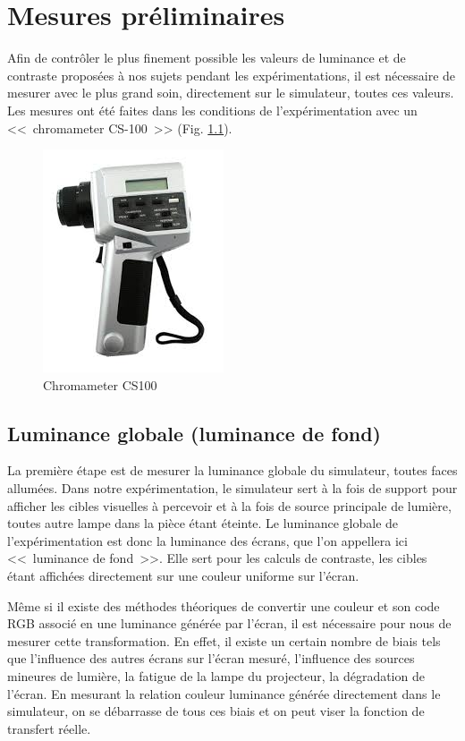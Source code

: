 \chapter{Mesures préliminaires}
\par Afin de contrôler le plus finement possible les valeurs de luminance et de contraste proposées à nos sujets pendant les expérimentations, il est nécessaire de mesurer avec le plus grand soin, directement sur le simulateur, toutes ces valeurs. Les mesures ont été faites dans les conditions de l'expérimentation avec un <<~chromameter CS-100~>> (Fig. \ref{fig:chromameter_cs100}).

\begin{figure}
	\centering
	\includegraphics[scale=1]{Figures/ChromameterCS100}
	\caption{Chromameter CS100}
	\label{fig:chromameter_cs100}
\end{figure}
	
	\section{Luminance globale (luminance de fond)}
	\par La première étape est de mesurer la luminance globale du simulateur, toutes faces allumées. Dans notre expérimentation, le simulateur sert à la fois de support pour afficher les cibles visuelles à percevoir et à la fois de source principale de lumière, toutes autre lampe dans la pièce étant éteinte. Le luminance globale de l'expérimentation est donc la luminance des écrans, que l'on appellera ici <<~luminance de fond~>>. Elle sert pour les calculs de contraste, les cibles étant affichées directement sur une couleur uniforme sur l'écran.
	
	\par Même si il existe des méthodes théoriques de convertir une couleur et son code RGB associé en une luminance générée par l'écran, il est nécessaire pour nous de mesurer cette transformation. En effet, il existe un certain nombre de biais tels que l'influence des autres écrans sur l'écran mesuré, l'influence des sources mineures de lumière, la fatigue de la lampe du projecteur, la dégradation de l'écran. En mesurant la relation couleur luminance générée directement dans le simulateur, on se débarrasse de tous ces biais et on peut viser la fonction de transfert réelle.
	
